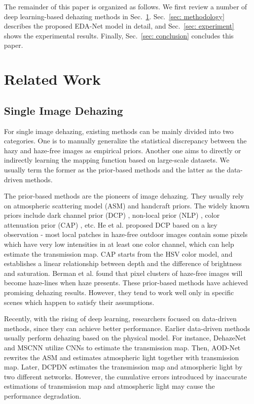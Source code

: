 \documentclass[lettersize,journal]{IEEEtran}
\begin{document}
The remainder of this paper is organized as follows. We first review a number of deep learning-based dehazing methods in Sec.~\ref{sec: related work}.
Sec.~\ref{sec: methodology} describes the proposed EDA-Net model in detail, and Sec.~\ref{sec: experiment} shows the experimental results.
Finally, Sec.~\ref{sec: conclusion} concludes this paper.


{\color{black}
\section{Related Work}
\label{sec: related work}
\subsection{Single Image Dehazing}

For single image dehazing, existing methods can be mainly divided into two categories. 
One is to manually generalize the statistical discrepancy between the hazy and haze-free images as empirical priors. 
Another one aims to directly or indirectly learning the mapping function based on large-scale datasets. 
We usually term the former as the prior-based methods and the latter as the data-driven methods.

The prior-based methods are the pioneers of image dehazing. 
They usually rely on atmospheric scattering model (ASM) \cite{Narasimhan2003TPAMI-ASM} and handcraft priors. 
The widely known priors include dark channel prior (DCP) \cite{He2009CVPR-DCP,he2010TPAMI}, non-local prior (NLP) \cite{berman2016CVPR}, color attenuation prior (CAP) \cite{zhu2015TIP}, etc. 
He et al. \cite{He2009CVPR-DCP,he2010TPAMI} proposed DCP based on a key observation - most local patches in haze-free outdoor images contain some pixels which have very low intensities in at least one color channel, which can help estimate the transmission map.
CAP \cite{zhu2015TIP} starts from the HSV color model, and establishes a linear relationship between depth and the difference of brightness and saturation.
Berman et al. \cite{berman2016CVPR} found that pixel clusters of haze-free images will become haze-lines when haze presents. 
These prior-based methods have achieved promising dehazing results.
However, they tend to work well only in specific scenes which happen to satisfy their assumptions.

Recently, with the rising of deep learning, researchers focused on data-driven methods, since they can achieve better performance.
Earlier data-driven methods usually perform dehazing based on the physical model. 
For instance, DehazeNet \cite{cai2016TIP} and MSCNN \cite{ren2016ECCV} utilize CNNs to estimate the transmission map. 
Then, AOD-Net \cite{li2017ICCV} rewrites the ASM and estimates atmospheric light together with transmission map. 
Later, DCPDN \cite{zhang2018CVPR} estimates the transmission map and atmospheric light by two different networks. 
However, the cumulative errors introduced by inaccurate estimations of transmission map and atmospheric light may cause the performance degradation. 

}
\end{document}
